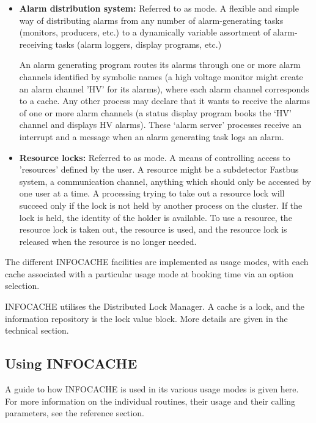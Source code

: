 \begin{itemize}
\item{\bf Alarm distribution system: }
    Referred to as \alarm mode.
    A flexible and simple way of distributing alarms from any number of
    alarm-generating tasks (monitors, producers, etc.) to a dynamically
    variable assortment of alarm-receiving tasks (alarm loggers,
    display programs, etc.)

    An alarm generating program routes its alarms through one or more
    alarm channels identified by symbolic names (\eg a high voltage
    monitor might create an alarm channel 'HV' for its alarms), where each
    alarm channel corresponds to a cache.
    Any other process may declare that it wants to receive the alarms 
    of one or more alarm channels (\eg a status display program books
    the `HV' channel and displays HV alarms). These `alarm server'
    processes receive an interrupt and a message when an alarm
    generating task logs an alarm. 
    
\item{\bf Resource locks: }
    Referred to as \reslock mode.
    A means of controlling access to 'resources' defined by the user. A
    resource might be a subdetector Fastbus system, a communication channel,
    anything which should only be accessed by one user at a time. A
    processing trying to take out a resource lock will succeed only if the
    lock is not held by another process on the cluster. If the lock is
    held, the identity of the holder is available. To use a resource, the
    resource lock is taken out, the resource is used, and the resource lock
    is released when the resource is no longer needed.


\end{itemize}

The different INFOCACHE facilities are implemented as usage modes,
with each cache associated with a particular usage mode at booking time via
an option selection.

INFOCACHE utilises the Distributed Lock Manager. A cache is a lock, and
the information repository is the lock value block. More details are given
in the technical section.

\subsection{Using INFOCACHE}

A guide to how INFOCACHE is used in its various usage modes is given
here. For more information on the individual routines, their usage and
their calling parameters, see the reference section.

